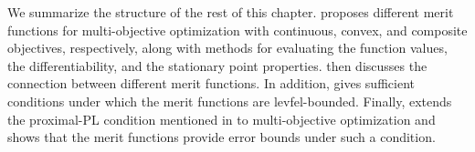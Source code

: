 \documentclass[../main]{subfiles}
\begin{document}
We summarize the structure of the rest of this chapter.
 proposes different merit functions for multi-objective optimization with continuous, convex, and composite objectives, respectively, along with methods for evaluating the function values, the differentiability, and the stationary point properties.
 then discusses the connection between different merit functions.
In addition,  gives sufficient conditions under which the merit functions are levfel-bounded.
Finally,  extends the proximal-PL condition mentioned in  to multi-objective optimization and shows that the merit functions provide error bounds under such a condition.
\end{document}
